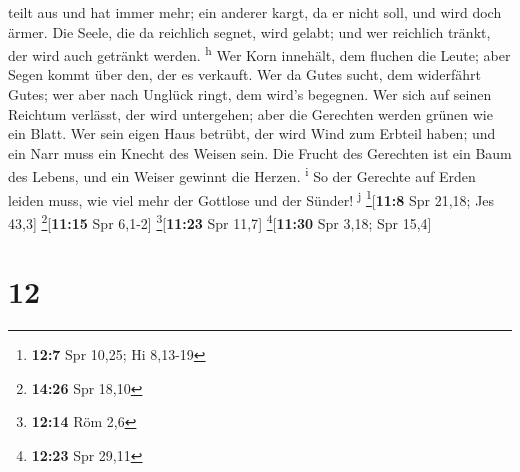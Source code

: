 teilt aus und hat immer mehr; ein anderer kargt, da er nicht soll, und
wird doch ärmer.  Die Seele, die da reichlich segnet,
wird gelabt; und wer reichlich tränkt, der wird auch getränkt werden.
\textsuperscript{h}  Wer Korn innehält, dem fluchen die
Leute; aber Segen kommt über den, der es verkauft.  Wer
da Gutes sucht, dem widerfährt Gutes; wer aber nach Unglück ringt, dem
wird's begegnen.  Wer sich auf seinen Reichtum verlässt,
der wird untergehen; aber die Gerechten werden grünen wie ein Blatt.
 Wer sein eigen Haus betrübt, der wird Wind zum Erbteil
haben; und ein Narr muss ein Knecht des Weisen sein.  Die
Frucht des Gerechten ist ein Baum des Lebens, und ein Weiser gewinnt die
Herzen. \textsuperscript{i}  So der Gerechte auf Erden
leiden muss, wie viel mehr der Gottlose und der Sünder!
\textsuperscript{j} \footnote{\textbf{12:7} Spr 10,25; Hi 8,13-19}{[}\textbf{11:8}
Spr 21,18; Jes 43,3{]} \footnote{\textbf{14:26} Spr 18,10}{[}\textbf{11:15}
Spr 6,1-2{]} \footnote{\textbf{12:14} Röm 2,6}{[}\textbf{11:23} Spr
11,7{]} \footnote{\textbf{12:23} Spr 29,11}{[}\textbf{11:30} Spr 3,18;
Spr 15,4{]}

\hypertarget{section-11}{%
\section{12}\label{section-11}}

